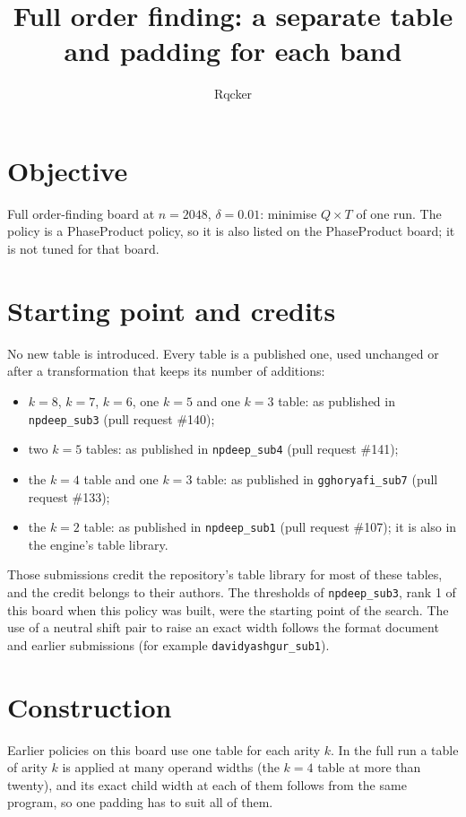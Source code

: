 \documentclass[11pt]{article}
\title{Full order finding: a separate table and padding for each band}
\author{Rqcker}
\date{}
\begin{document}
\maketitle

\section*{Objective}
Full order-finding board at $n = 2048$, $\delta = 0.01$: minimise $Q \times T$ of one run. The policy is a
PhaseProduct policy, so it is also listed on the PhaseProduct board; it is not tuned for that board.

\section*{Starting point and credits}
No new table is introduced. Every table is a published one, used unchanged or after a transformation that
keeps its number of additions:
\begin{itemize}
\item $k=8$, $k=7$, $k=6$, one $k=5$ and one $k=3$ table: as published in \texttt{npdeep\_sub3} (pull request \#140);
\item two $k=5$ tables: as published in \texttt{npdeep\_sub4} (pull request \#141);
\item the $k=4$ table and one $k=3$ table: as published in \texttt{gghoryafi\_sub7} (pull request \#133);
\item the $k=2$ table: as published in \texttt{npdeep\_sub1} (pull request \#107); it is also in the engine's table library.
\end{itemize}
Those submissions credit the repository's table library for most of these tables, and the credit belongs to
their authors. The thresholds of \texttt{npdeep\_sub3}, rank 1 of this board when this policy was built, were the
starting point of the search. The use of a neutral shift pair to raise an exact width follows the format
document and earlier submissions (for example \texttt{davidyashgur\_sub1}).

\section*{Construction}
Earlier policies on this board use one table for each arity $k$. In the full run a table of arity $k$ is applied
at many operand widths (the $k=4$ table at more than twenty), and its exact child width at each of them follows
from the same program, so one padding has to suit all of them.
\end{document}

